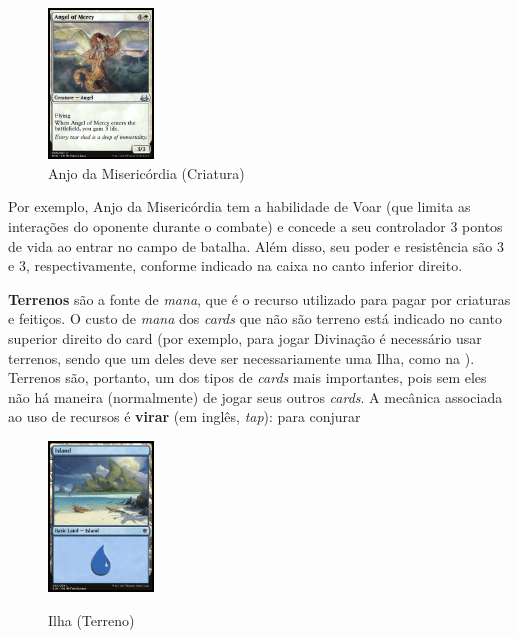 \documentclass{book}
\begin{document}
\begin{figure}
\centering
    \includegraphics[width=0.25\textwidth]{picstcc/angelOfMercy.jpg}
    \caption{Anjo da Misericórdia (Criatura)}
    \label{anjo}
\end{figure}

Por exemplo, Anjo da Misericórdia tem a habilidade de Voar (que limita as interações do oponente durante o combate) e concede a seu controlador 3 pontos de vida ao entrar no campo de batalha. Além disso, seu poder e resistência são 3 e 3, respectivamente, conforme indicado na caixa no canto inferior direito.

\textbf{Terrenos} são a fonte de \textit{mana}, que é o recurso utilizado para pagar por criaturas e feitiços. O custo de \textit{mana} dos \textit{cards} que não são terreno está indicado no canto superior direito do card (por exemplo, para jogar Divinação é necessário usar terrenos, sendo que um deles deve ser necessariamente uma Ilha, como na \cite{ilha}). Terrenos são, portanto, um dos tipos de \textit{cards} mais importantes, pois sem eles não há maneira (normalmente) de jogar seus outros \textit{cards}. A mecânica associada ao uso de recursos é \textbf{virar} (em inglês, \textit{tap}): para conjurar

\begin{figure}
    \centering
    \includegraphics[width=0.25\textwidth]{picstcc/island.jpg}
    \label{ilha}
    \caption{Ilha (Terreno)}
\end{figure}
\end{document}
